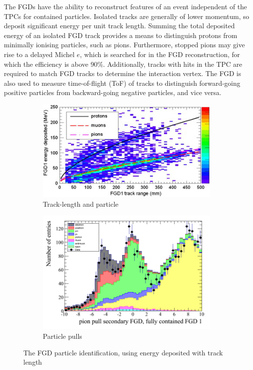 The FGDs have the ability to reconstruct features of an event independent of the TPCs for contained particles. Isolated tracks are generally of lower momentum, so deposit significant energy per unit track length. Summing the total deposited energy of an isolated FGD track provides a means to distinguish protons from minimally ionising particles, such as pions. Furthermore, stopped pions may give rise to a delayed Michel $e$, which is searched for in the FGD reconstruction, for which the efficiency is above 90\%. Additionally, tracks with hits in the TPC are required to match FGD tracks to determine the interaction vertex. The FGD is also used to measure time-of-flight (ToF) of tracks to distinguish forward-going positive particles from backward-going negative particles, and vice versa.
\begin{figure}[h]
	\begin{subfigure}[t]{0.47\textwidth}
		\includegraphics[width=\textwidth, trim={0mm 0mm 0mm 0mm}, clip,page=1]{figures/det_chap/fgd/fgd_byrange}
		\caption{Track-length and particle}
	\end{subfigure}
	\begin{subfigure}[t]{0.47\textwidth}
		\includegraphics[width=\textwidth, trim={0mm 0mm 0mm 0mm}, clip,page=1]{figures/numu/Cuts/pull_secondarytrack_FGD_all_fullycontained}
		\caption{Particle pulls}
	\end{subfigure}	
	\caption{The FGD particle identification, using energy deposited with track length}
	\label{fig:fgd_reco}
\end{figure}


